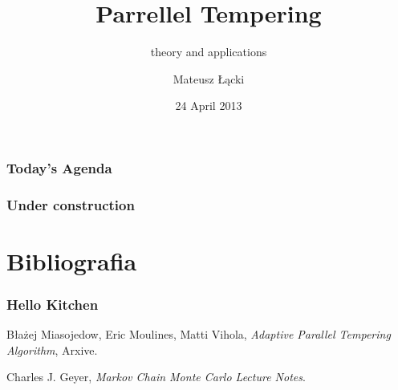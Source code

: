 \documentclass[xetex]{beamer}
\title[Parrellel Tempering]{Parrellel Tempering }
\subtitle{theory and applications}
\date{24 April 2013}
\author[Łącki]{Mateusz Łącki}
\institute[UW]{Uniwersytet Warszawski}
\begin{document}


	\begin{frame}
		\titlepage
	\end{frame}

	\begin{frame}
		\frametitle{Today's Agenda}
		\tableofcontents
	\end{frame}


	
	



\begin{frame}
	\frametitle{Under construction}
\end{frame}


\section[Bibliografia]{Bibliografia}

\begin{frame}

	\frametitle{Hello Kitchen}
	
	
	\begin{thebibliography}{10}

		\beamertemplatebookbibitems
		
	  			Błażej Miasojedow, Eric Moulines, Matti Vihola,
	 			\emph{Adaptive Parallel Tempering Algorithm},
	  			Arxive.

		\beamertemplatearticlebibitems
		
				Charles J. Geyer,
				\emph{Markov Chain Monte Carlo Lecture Notes}.  

	\end{thebibliography}

\end{frame}
\end{document}
